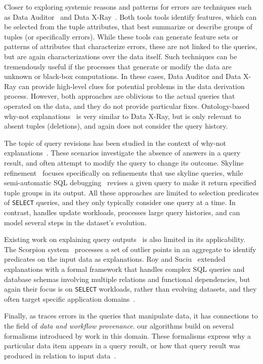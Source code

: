 Closer to exploring systemic reasons and patterns for errors are
techniques such as Data Auditor~\cite{GolabKKS10, Golab2008
} and Data
X-Ray~\cite{wang2015}. Both tools tools identify features, which can
be selected from the tuple attributes, that best summarize or describe
groups of tuples (or specifically errors). While these tools can
generate feature sets or patterns of attributes that characterize
errors, these are not linked to the queries, but are again
characterizations over the data itself. Such techniques can be
tremendously useful if the processes that generate or modify the data
are unknown or black-box computations. In these cases, Data Auditor
and Data X-Ray can provide high-level clues for potential problems in
the data derivation process. However, both approaches are oblivious to
the actual queries that operated on the data, and they do not provide
particular fixes. Ontology-based why-not
explanations~\cite{tenCate2015} is very similar to Data X-Ray, but is
only relevant to absent tuples (deletions), and again does not
consider the query history.

The topic of query revisions has been studied in the context of
why-not explanations~\cite{Chapman2009}. These scenarios investigate
the absence of answers in a query result, and often attempt to modify
the query to change its outcome. Skyline
refinement~\cite{tran2010conquer} focuses specifically on refinements
that use skyline queries, while semi-automatic SQL
debugging~\cite{tzompanaki14semi} revises a given query to make it
return specified tuple groups in its output. All these approaches are
limited to selection predicates of \texttt{SELECT} queries, and they
only typically consider one query at a time. In contrast, \sys handles
update workloads, processes large query histories, and can model
several steps in the dataset's evolution.

Existing work on explaining query outputs~\cite{GebalyAGKS14} is also
limited in its applicability. The Scorpion system~\cite{Wu13}
processes a set of outlier points in an aggregate to identify
predicates on the input data as explanations. Roy and
Suciu~\cite{Roy2014} extended explanations with a formal framework
that handles complex SQL queries and database schemas involving
multiple relations and functional dependencies, but again their focus
is on \texttt{SELECT} workloads, rather than evolving datasets, and
they often target specific application domains~\cite{Khoussainova2012, Thirumuruganathan2012, Das2011, Fabbri2011, Bender14
}.

Finally, as \sys traces errors in the queries that manipulate data, it
has connections to the field of \emph{data and workflow provenance}.
our algorithms build on several formalisms introduced by work in this
domain. These formalisms express why a particular data item appears in
a query result, or how that query result was produced in relation to
input data~\cite{BunemanKT01,GKT07-semirings, CheneyCT09, CuiWW00
}.


